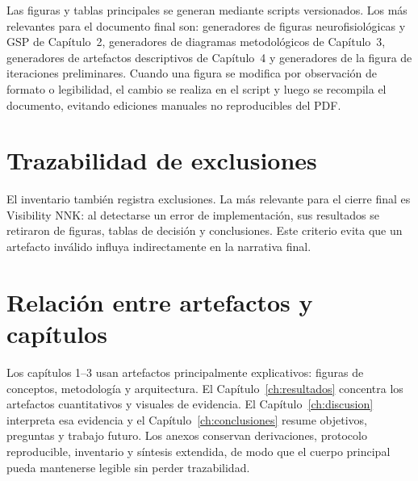 Las figuras y tablas principales se generan mediante scripts versionados. Los más relevantes para el documento final son: generadores de figuras neurofisiológicas y GSP de Capítulo~2, generadores de diagramas metodológicos de Capítulo~3, generadores de artefactos descriptivos de Capítulo~4 y generadores de la figura de iteraciones preliminares. Cuando una figura se modifica por observación de formato o legibilidad, el cambio se realiza en el script y luego se recompila el documento, evitando ediciones manuales no reproducibles del PDF.

\section{Trazabilidad de exclusiones}

El inventario también registra exclusiones. La más relevante para el cierre final es Visibility NNK: al detectarse un error de implementación, sus resultados se retiraron de figuras, tablas de decisión y conclusiones. Este criterio evita que un artefacto inválido influya indirectamente en la narrativa final.

\section{Relación entre artefactos y capítulos}

Los capítulos 1--3 usan artefactos principalmente explicativos: figuras de conceptos, metodología y arquitectura. El Capítulo~\ref{ch:resultados} concentra los artefactos cuantitativos y visuales de evidencia. El Capítulo~\ref{ch:discusion} interpreta esa evidencia y el Capítulo~\ref{ch:conclusiones} resume objetivos, preguntas y trabajo futuro. Los anexos conservan derivaciones, protocolo reproducible, inventario y síntesis extendida, de modo que el cuerpo principal pueda mantenerse legible sin perder trazabilidad.
